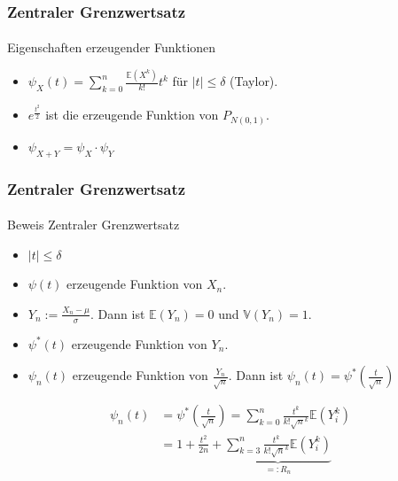 \documentclass{beamer}
\begin{document}
\begin{frame}
    \frametitle{Zentraler Grenzwertsatz}
\framesubtitle{}
\begin{block}{Eigenschaften erzeugender Funktionen}
\begin{itemize}
\item $\psi_X(t) = \sum_{k= 0}^n \frac{\mathbb{E}(X^k)}{k!} t^k$ für $|t| \leq \delta$ (Taylor).
\item $e^{\frac{t^2}{2}}$ ist die erzeugende Funktion von $ P_{N(0,1)}$.
\item $\psi_{X +Y} = \psi_X \cdot \psi_Y$
\end{itemize}

\end{block}


 \end{frame}




\begin{frame}
    \frametitle{Zentraler Grenzwertsatz}
\framesubtitle{}

\begin{block}{Beweis Zentraler Grenzwertsatz}
\begin{itemize}
\item $|t| \leq \delta$
\item $\psi(t)$ erzeugende Funktion von $X_n$.
\item $Y_n := \frac{X_n - \mu}{\sigma}$. Dann ist $\mathbb{E}(Y_n) = 0$ und $\mathbb{V}(Y_n) = 1$.
\item $\psi^*(t)$ erzeugende Funktion von $Y_n$.
\item $\psi_n(t)$ erzeugende Funktion von $\frac{Y_n}{\sqrt{n}}$. Dann ist $\psi_n(t) = \psi^*(\frac{t}{\sqrt{n}})$ 
\end{itemize}
\begin{align*}
\psi_n(t) &= \psi^*(\frac{t}{\sqrt{n}}) =  \sum_{k= 0}^n \frac{t^k }{k! \sqrt{n}^k} \mathbb{E}(Y_i^k) \\
& = 1 + \frac{t^2}{2n} +  \underbrace{\sum_{k= 3}^n \frac{t^k }{k! \sqrt{n}^k} \mathbb{E}(Y_i^k)}_{=:R_n} 
\end{align*}
\end{block}

 \end{frame}
\end{document}
